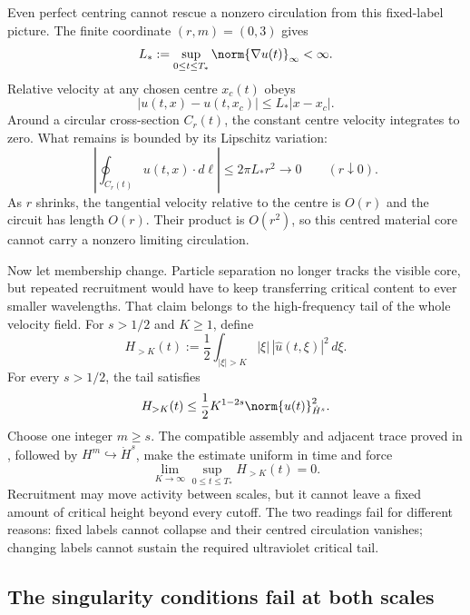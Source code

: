 Even perfect centring cannot rescue a nonzero circulation from this fixed-label
picture.  The finite coordinate \((r,m)=(0,3)\) gives
\begin{equation}\label{eq:BodyUniformLipschitzBound}
  L_*:=\sup_{0\leq t\leq T_*}\norm{\nabla u(t)}_\infty<\infty.
\end{equation}
Relative velocity at any chosen centre \(x_c(t)\) obeys
\[
  |u(t,x)-u(t,x_c)|\leq L_*|x-x_c|.
\]
Around a circular cross-section \(C_r(t)\), the constant centre velocity
integrates to zero.  What remains is bounded by its Lipschitz variation:
\begin{equation}\label{eq:BodyCenteredCirculationBound}
  \left|
    \oint_{C_r(t)}u(t,x)\cdot d\ell
  \right|
  \leq2\pi L_*r^2
  \longrightarrow0
  \qquad(r\downarrow0).
\end{equation}
As \(r\) shrinks, the tangential velocity relative to the centre is \(O(r)\)
and the circuit has length \(O(r)\).  Their product is \(O(r^2)\), so this
centred material core cannot carry a nonzero limiting circulation.

Now let membership change.  Particle separation no longer tracks the visible
core, but repeated recruitment would have to keep transferring critical content
to ever smaller wavelengths.  That claim belongs to the high-frequency tail of
the whole velocity field.
For \(s>1/2\) and \(K\geq1\), define
\[
  H_{>K}(t)
  :=\frac12\int_{|\xi|>K}
  |\xi|\,|\widehat u(t,\xi)|^2\,d\xi.
\]
For every \(s>1/2\), the tail satisfies
\begin{equation}\label{eq:BodyUltravioletCriticalTail}
  H_{>K}(t)
  \leq
  \frac12K^{1-2s}\norm{u(t)}_{\dot H^s}^2.
\end{equation}
Choose one integer \(m\geq s\).  The compatible assembly and adjacent trace
proved in ,
followed by \(H^m\hookrightarrow\dot H^s\), make the estimate uniform in time
and force
\begin{equation}\label{eq:BodyUniformUltravioletVanishing}
  \lim_{K\to\infty}
  \sup_{0\leq t\leq T_*}H_{>K}(t)=0.
\end{equation}
Recruitment may move activity between scales, but it cannot leave a fixed amount
of critical height beyond every cutoff.
The two readings fail for different reasons: fixed labels cannot collapse and
their centred circulation vanishes; changing labels cannot sustain the required
ultraviolet critical tail.

\subsection{The singularity conditions fail at both scales}\label{sub:TheLocalSingularityPictureCloses}


